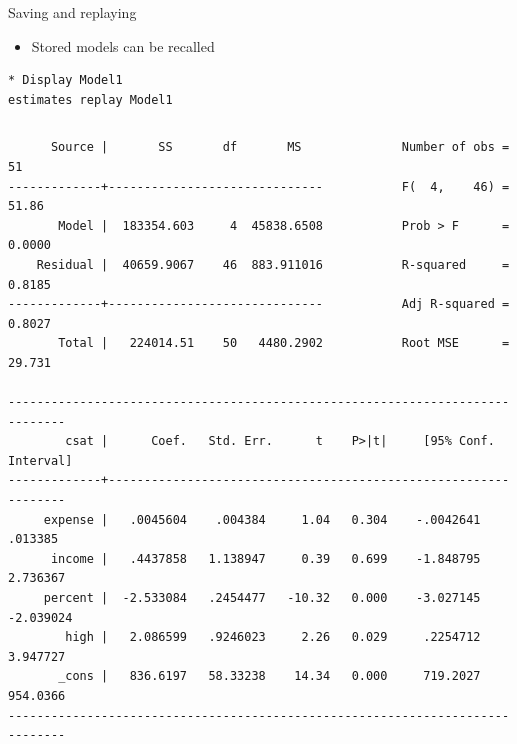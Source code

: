 \documentclass[table,smaller]{beamer}
\begin{document}
\begin{frame}[fragile,label=sec-5-3]{Saving and replaying}
 \begin{itemize}
\item Stored models can be recalled
\end{itemize}


\begin{verbatim}
* Display Model1
estimates replay Model1
\end{verbatim}


\vspace{-.5em}
\begin{columns}
\begin{block}{}
\begin{verbatim}
      Source |       SS       df       MS              Number of obs =      51
-------------+------------------------------           F(  4,    46) =   51.86
       Model |  183354.603     4  45838.6508           Prob > F      =  0.0000
    Residual |  40659.9067    46  883.911016           R-squared     =  0.8185
-------------+------------------------------           Adj R-squared =  0.8027
       Total |   224014.51    50   4480.2902           Root MSE      =  29.731

------------------------------------------------------------------------------
        csat |      Coef.   Std. Err.      t    P>|t|     [95% Conf. Interval]
-------------+----------------------------------------------------------------
     expense |   .0045604    .004384     1.04   0.304    -.0042641     .013385
      income |   .4437858   1.138947     0.39   0.699    -1.848795    2.736367
     percent |  -2.533084   .2454477   -10.32   0.000    -3.027145   -2.039024
        high |   2.086599   .9246023     2.26   0.029     .2254712    3.947727
       _cons |   836.6197   58.33238    14.34   0.000     719.2027    954.0366
------------------------------------------------------------------------------
\end{verbatim}
\end{block}
\end{columns}
\vspace{.5em}
\end{frame}
\end{document}
